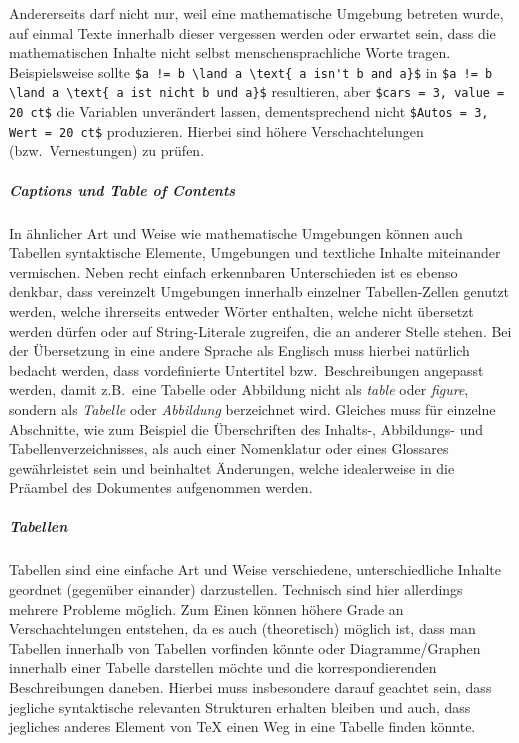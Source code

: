 Andererseits darf nicht nur, weil eine mathematische Umgebung betreten wurde, auf einmal Texte innerhalb dieser vergessen werden oder erwartet sein, dass die mathematischen Inhalte nicht selbst menschensprachliche Worte tragen. Beispielsweise sollte \verb|$a != b \land a \text{ a isn't b and a}$| in \verb|$a != b \land a \text{ a ist nicht b und a}$| resultieren, aber \verb|$cars = 3, value = 20 ct$| die Variablen unverändert lassen, dementsprechend nicht \verb|$Autos = 3, Wert = 20 ct$| produzieren.
Hierbei sind höhere Verschachtelungen (bzw.\ Vernestungen) zu prüfen. 

\subparagraph*{Captions und Table of Contents}\par
In ähnlicher Art und Weise wie mathematische Umgebungen können auch Tabellen syntaktische Elemente, Umgebungen und textliche Inhalte miteinander vermischen.%
Neben recht einfach erkennbaren Unterschieden ist es ebenso denkbar, dass vereinzelt Umgebungen innerhalb einzelner Tabellen-Zellen genutzt werden, welche ihrerseits entweder Wörter enthalten, welche nicht übersetzt werden dürfen oder auf String-Literale zugreifen, die an anderer Stelle stehen. Bei der Übersetzung in eine andere Sprache als Englisch muss hierbei natürlich bedacht werden, dass vordefinierte Untertitel bzw.\ Beschreibungen angepasst werden, damit z.B.\ eine Tabelle oder Abbildung nicht als \textit{table} oder \textit{figure}, sondern als \textit{Tabelle} oder \textit{Abbildung} berzeichnet wird. Gleiches muss für einzelne Abschnitte, wie zum Beispiel die Überschriften des Inhalts-, Abbildungs- und Tabellenverzeichnisses, als auch einer Nomenklatur oder eines Glossares gewährleistet sein und beinhaltet Änderungen, welche idealerweise in die Präambel des Dokumentes aufgenommen werden.

\subparagraph*{Tabellen}\par
Tabellen sind eine einfache Art und Weise verschiedene, unterschiedliche Inhalte geordnet (gegenüber einander) darzustellen. Technisch sind hier allerdings mehrere Probleme möglich. Zum Einen können höhere Grade an Verschachtelungen entstehen, da es auch (theoretisch) möglich ist, dass man Tabellen innerhalb von Tabellen vorfinden könnte oder Diagramme/Graphen innerhalb einer Tabelle darstellen möchte und die korrespondierenden Beschreibungen daneben.%
Hierbei muss insbesondere darauf geachtet sein, dass jegliche syntaktische relevanten Strukturen erhalten bleiben und auch, dass jegliches anderes Element von \TeX{} einen Weg in eine Tabelle finden könnte.

